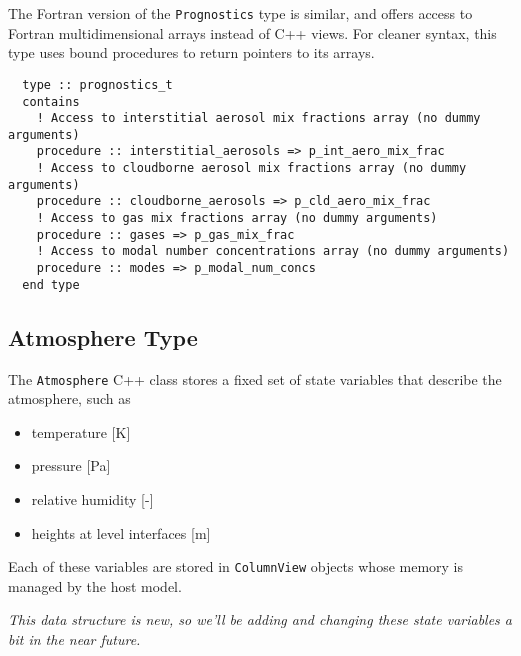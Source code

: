 The Fortran version of the \texttt{Prognostics} type is similar, and offers
access to Fortran multidimensional arrays instead of C++ views. For cleaner
syntax, this type uses bound procedures to return pointers to its arrays.

\begin{lstlisting}
  type :: prognostics_t
  contains
    ! Access to interstitial aerosol mix fractions array (no dummy arguments)
    procedure :: interstitial_aerosols => p_int_aero_mix_frac
    ! Access to cloudborne aerosol mix fractions array (no dummy arguments)
    procedure :: cloudborne_aerosols => p_cld_aero_mix_frac
    ! Access to gas mix fractions array (no dummy arguments)
    procedure :: gases => p_gas_mix_frac
    ! Access to modal number concentrations array (no dummy arguments)
    procedure :: modes => p_modal_num_concs
  end type
\end{lstlisting}

\subsection{Atmosphere Type}

The \texttt{Atmosphere} C++ class stores a fixed set of state variables that
describe the atmosphere, such as

\begin{itemize}
  \item temperature [K]
  \item pressure [Pa]
  \item relative humidity [-]
  \item heights at level interfaces [m]
\end{itemize}

Each of these variables are stored in \texttt{ColumnView} objects whose memory
is managed by the host model.

{\em This data structure is new, so we'll be adding and changing these state
variables a bit in the near future.}

